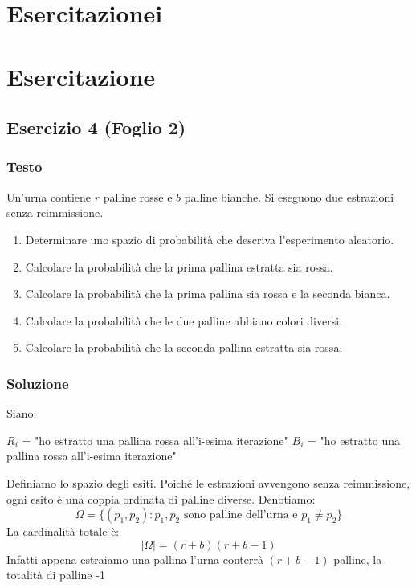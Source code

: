 \section{Esercitazionei}

\section{Esercitazione}
\subsection{Esercizio 4 (Foglio 2)}
\subsubsection{Testo}
Un’urna contiene \(r\) palline rosse e \(b\) palline bianche. Si eseguono due estrazioni senza reimmissione.
\begin{enumerate}[label=(\alph*)]
    \item Determinare uno spazio di probabilità che descriva l’esperimento aleatorio.
    \item Calcolare la probabilità che la prima pallina estratta sia rossa.
    \item Calcolare la probabilità che la prima pallina sia rossa e la seconda bianca.
    \item Calcolare la probabilità che le due palline abbiano colori diversi.
    \item Calcolare la probabilità che la seconda pallina estratta sia rossa.
\end{enumerate}

\subsubsection{Soluzione}
Siano:

$R_i$ = "ho estratto una pallina rossa all'i-esima iterazione"
$B_i$ = "ho estratto una pallina rossa all'i-esima iterazione"

Definiamo lo spazio degli esiti. Poiché le estrazioni avvengono senza reimmissione, ogni esito è una coppia ordinata di palline diverse. Denotiamo:
\[
    \Omega = \{ (p_1, p_2) : p_1, p_2 \text{ sono palline dell'urna e } p_1 \neq p_2 \}
\]
La cardinalità totale è:
\[
    |\Omega| = (r+b)(r+b-1)
\]
Infatti appena estraiamo una pallina l'urna conterrà $(r+b-1)$ palline, la totalità di palline -1

